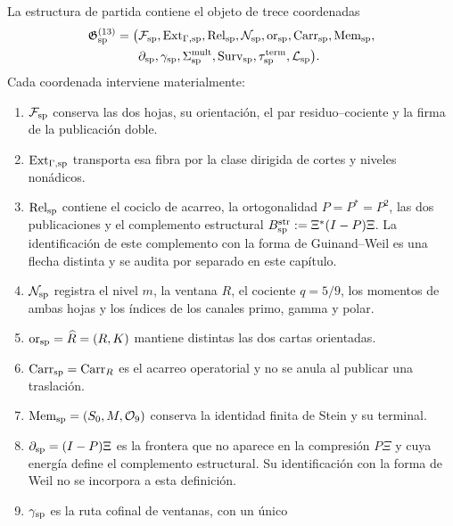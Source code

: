 La estructura de partida contiene el objeto de trece coordenadas
\begin{equation}\label{eq:pdf2-rh-res-sp-completa}
\begin{aligned}
 \mathfrak G_{\rm sp}^{(13)}=\bigl(&
 \mathcal F_{\rm sp},
 \operatorname{Ext}_{\Gamma,{\rm sp}},
 \operatorname{Rel}_{\rm sp},
 \mathcal N_{\rm sp},
 \operatorname{or}_{\rm sp},
 \operatorname{Carr}_{\rm sp},
 \operatorname{Mem}_{\rm sp},\\
 &\partial_{\rm sp},
 \gamma_{\rm sp},
 \Sigma_{\rm sp}^{\rm mult},
 \operatorname{Surv}_{\rm sp},
 \tau_{\rm sp}^{\rm term},
 \mathcal L_{\rm sp}\bigr).
\end{aligned}
\end{equation}
Cada coordenada interviene materialmente:
\begin{enumerate}
 \item \(\mathcal F_{\rm sp}\) conserva las dos hojas, su orientación, el
 par residuo--cociente y la firma de la publicación doble.
 \item \(\operatorname{Ext}_{\Gamma,{\rm sp}}\) transporta esa fibra por la
 clase dirigida de cortes y niveles nonádicos.
    \item \(\operatorname{Rel}_{\rm sp}\) contiene el cociclo de acarreo, la
    ortogonalidad \(P=P^*=P^2\), las dos publicaciones y el complemento
    estructural \(B_{\rm sp}^{\rm str}:=\Xi^*(I-P)\Xi\). La identificación
    de este complemento con la forma de Guinand--Weil es una flecha distinta
    y se audita por separado en este capítulo.
 \item \(\mathcal N_{\rm sp}\) registra el nivel \(m\), la ventana \(R\),
 el cociente \(q=5/9\), los momentos de ambas hojas y los índices de los
 canales primo, gamma y polar.
 \item \(\operatorname{or}_{\rm sp}=\widehat R=(R,K)\) mantiene distintas
 las dos cartas orientadas.
 \item \(\operatorname{Carr}_{\rm sp}=\operatorname{Carr}_R\) es el
 acarreo operatorial y no se anula al publicar una traslación.
 \item \(\operatorname{Mem}_{\rm sp}=(S_0,M,\mathcal O_9)\) conserva la
 identidad finita de Stein y su terminal.
 \item \(\partial_{\rm sp}=(I-P)\Xi\) es la frontera que no aparece en la
 compresión \(P\Xi\) y cuya energía define el complemento estructural. Su
 identificación con la forma de Weil no se incorpora a esta definición.
 \item \(\gamma_{\rm sp}\) es la ruta cofinal de ventanas, con un único

\end{enumerate}
